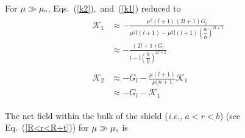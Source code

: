 For $\mu\gg\mu_{\scriptscriptstyle 0}$, Eqs.~(\ref{k2}),~and~(\ref{k1}) reduced to
\begin{align}
    \begin{split}\label{k12}
        \mathcal{K}_1 & \approx-\frac{\mu^2(l+1) (2l+1)G_l}{\mu^2 l(l+1)-\mu^2 l(l+1)\left(\dfrac{a}{b}\right)^{2l+1}}\\
        & \approx-\frac{(2l+1)G_l}{l-l\left(\dfrac{a}{b}\right)^{2l+1}}
    \end{split}\\
    \begin{split}\label{k12}
        \mathcal{K}_2 & \approx-G_l-\frac{\mu(l+1)}{\mu(n+1}\mathcal{K}_1\\
        & \approx-G_l-\mathcal{K}_1
    \end{split}
\end{align}


The net field  within the bulk of the shield (\textit{i.e.}, $a<r<b$) (see Eq.~(\ref{R<r<R+t})) for \(\mu\gg\mu_{\scriptscriptstyle 0}\) is 



